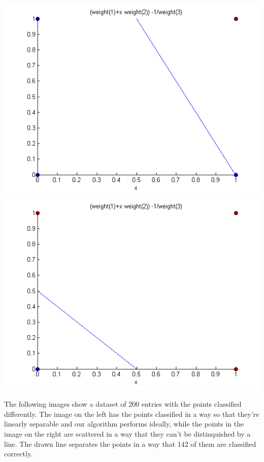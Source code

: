 \documentclass{article}
\begin{document}
\includegraphics[scale=0.5]{img/and_correct}
\includegraphics[scale=0.5]{img/or_correct}


The following images show a dataset of 200 entries with the points classified differently. The image on the left has the points classified in a way so that they're linearly separable and our algorithm performs ideally, while the points in the image on the right are scattered in a way that they can't be distinquished by a line. The drawn line separates the points in a way that 142 of them are classified correctly.
\end{document}

